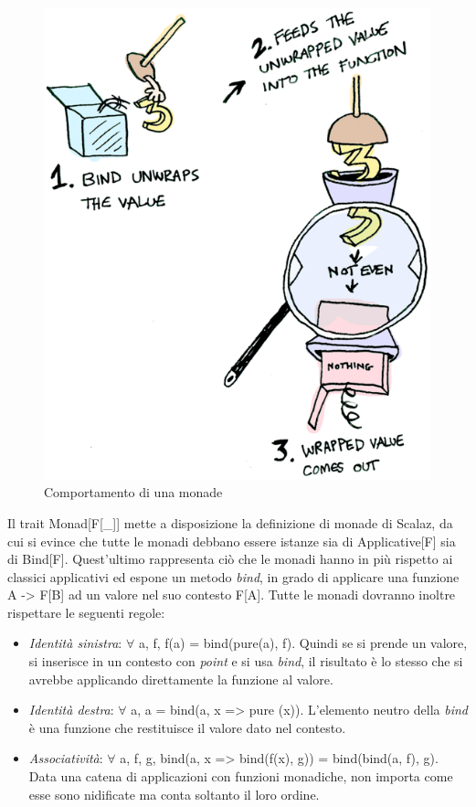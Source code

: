 \begin{figure}[th]
\centering
\includegraphics[scale=0.42]{images/monad}
\decoRule
\caption[monad]{Comportamento di una monade \cite{FunctorsApplicativesMonads}}
\end{figure}

Il trait Monad[F[\_]] mette a disposizione la definizione di monade di Scalaz, da cui si evince che tutte le monadi debbano essere istanze sia di Applicative[F] sia di Bind[F]. Quest'ultimo rappresenta ciò che le monadi hanno in più rispetto ai classici applicativi ed espone un metodo \textit{bind}, in grado di applicare una funzione A -> F[B] ad un valore nel suo contesto F[A]. Tutte le monadi dovranno inoltre rispettare le seguenti regole:

\begin{itemize}
\item \textit{Identità sinistra}: $\forall$ a, f, f(a) = bind(pure(a), f). Quindi se si prende un valore, si inserisce in un contesto con \textit{point} e si usa \textit{bind}, il risultato è lo stesso che si avrebbe applicando direttamente la funzione al valore.
\item \textit{Identità destra}: $\forall$ a, a = bind(a, x => pure (x)). L'elemento neutro della \textit{bind} è una funzione che restituisce il valore dato nel contesto.
\item \textit{Associatività}: $\forall$ a, f, g, bind(a, x => bind(f(x), g)) = bind(bind(a, f), g). Data una catena di applicazioni con funzioni monadiche, non importa come esse sono nidificate ma conta soltanto il loro ordine.
\end{itemize}

